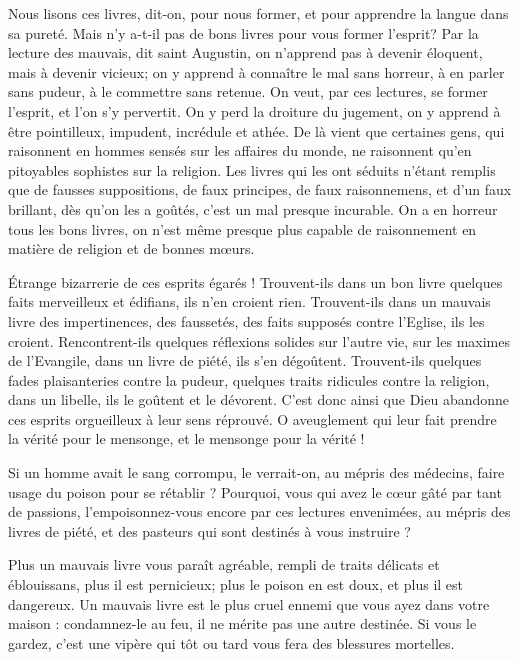 \documentclass[instructions.tex]{subfiles}
\begin{document}
\tertio Nous lisons ces livres, dit-on, pour nous former, et pour apprendre la langue dans sa pureté. Mais n'y a-t-il pas de bons livres pour vous former l'esprit? Par la lecture des mauvais, dit saint Augustin, on n'apprend pas à devenir éloquent, mais à devenir vicieux; on y apprend à connaître le mal sans horreur, à en parler sans pudeur, à le commettre sans retenue. On veut, par ces lectures, se former l'esprit, et l'on s'y pervertit. On y perd la droiture du jugement, on y apprend à être pointilleux, impudent, incrédule et athée. De là vient que certaines gens, qui raisonnent en hommes sensés sur les affaires du monde, ne raisonnent qu'en pitoyables sophistes sur la religion. Les livres qui les ont séduits n'étant remplis que de fausses suppositions, de faux principes, de faux raisonnemens, et d'un faux brillant, dès qu'on les a goûtés, c'est un mal presque incurable. On a en horreur tous les bons livres, on n'est même presque plus capable de raisonnement en matière de religion et de bonnes mœurs.
 
Étrange bizarrerie de ces esprits égarés ! Trouvent-ils dans un bon livre quelques faits merveilleux et édifians, ils n'en croient rien. Trouvent-ils dans un mauvais livre des impertinences, des faussetés, des faits supposés contre l'Eglise, ils les croient. Rencontrent-ils quelques réflexions solides sur l'autre vie, sur les maximes de l'Evangile, dans un livre de piété, ils s'en dégoûtent. Trouvent-ils quelques fades plaisanteries contre la pudeur, quelques traits ridicules contre la religion, dans un libelle, ils le goûtent et le dévorent. C'est donc ainsi que Dieu abandonne ces esprits orgueilleux à leur sens réprouvé. O aveuglement qui leur fait prendre la vérité pour le mensonge, et le mensonge pour la vérité !
 
Si un homme avait le sang corrompu, le verrait-on, au mépris des médecins, faire usage du poison pour se rétablir ? Pourquoi, vous qui avez le cœur gâté par tant de passions, l'empoisonnez-vous encore par ces lectures envenimées, au mépris des livres de piété, et des pasteurs qui sont destinés à vous instruire ?
 
Plus un mauvais livre vous paraît agréable, rempli de traits délicats et éblouissans, plus il est pernicieux; plus le poison en est doux, et plus il est dangereux. Un mauvais livre est le plus cruel ennemi que vous ayez dans votre maison : condamnez-le au feu, il ne mérite pas une autre destinée. Si vous le gardez, c'est une vipère qui tôt ou tard vous fera des blessures mortelles.
 
\end{document}
